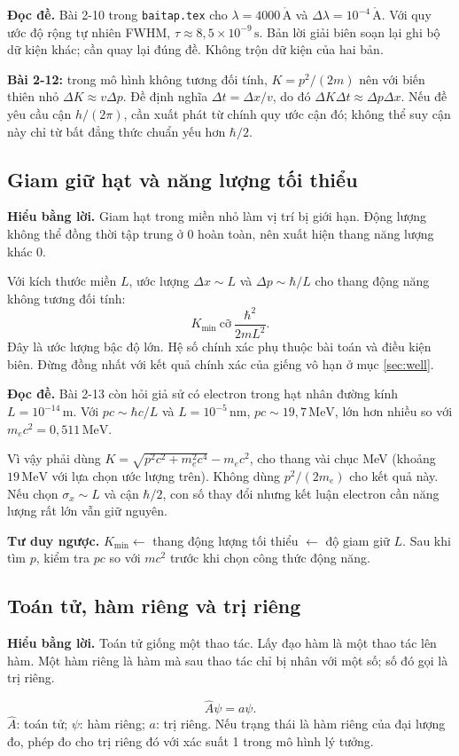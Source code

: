 \documentclass[11pt,a4paper]{article}
\newcommand{\unit}[1]{\,\mathrm{#1}}
\newcommand{\idea}[1]{\par\textbf{Hiểu bằng lời.} #1\par}
\newcommand{\readit}[1]{\par\textbf{Đọc đề.} #1\par}
\newcommand{\think}[1]{\par\textbf{Tư duy ngược.} #1\par}
\begin{document}
\readit{Bài 2-10 trong \texttt{baitap.tex} cho
$\lambda=4000\unit{\mathring A}$ và $\Delta\lambda=10^{-4}\unit{\mathring A}$.
Với quy ước độ rộng tự nhiên FWHM, $\tau\approx8{,}5\times10^{-9}\unit s$.
Bản lời giải biên soạn lại ghi bộ dữ kiện khác; cần quay lại đúng đề.
Không trộn dữ kiện của hai bản.}

\textbf{Bài 2-12:} trong mô hình không tương đối tính,
$K=p^2/(2m)$ nên với biến thiên nhỏ $\Delta K\approx v\Delta p$.
Đề định nghĩa $\Delta t=\Delta x/v$, do đó
$\Delta K\Delta t\approx\Delta p\Delta x$.
Nếu đề yêu cầu cận $h/(2\pi)$, cần xuất phát từ chính quy ước cận đó;
không thể suy cận này chỉ từ bất đẳng thức chuẩn yếu hơn $\hbar/2$.

\subsection{Giam giữ hạt và năng lượng tối thiểu}\label{sec:confinement}
\idea{Giam hạt trong miền nhỏ làm vị trí bị giới hạn. Động lượng không thể
đồng thời tập trung ở 0 hoàn toàn, nên xuất hiện thang năng lượng khác 0.}
Với kích thước miền $L$, ước lượng $\Delta x\sim L$ và
$\Delta p\sim\hbar/L$ cho thang động năng không tương đối tính:
\[
K_{\min}\ \text{cỡ}\ \frac{\hbar^2}{2mL^2}.
\]
Đây là ước lượng bậc độ lớn. Hệ số chính xác phụ thuộc bài toán và điều kiện biên.
Đừng đồng nhất với kết quả chính xác của giếng vô hạn ở mục \ref{sec:well}.

\readit{Bài 2-13 còn hỏi giả sử có electron trong hạt nhân đường kính
$L=10^{-14}\unit m$. Với $pc\sim\hbar c/L$ và $L=10^{-5}\unit{nm}$,
$pc\sim19{,}7\unit{MeV}$, lớn hơn nhiều so với $m_ec^2=0{,}511\unit{MeV}$.}
Vì vậy phải dùng
$K=\sqrt{p^2c^2+m_e^2c^4}-m_ec^2$, cho thang vài chục MeV
(khoảng $19\unit{MeV}$ với lựa chọn ước lượng trên).
Không dùng $p^2/(2m_e)$ cho kết quả này.
Nếu chọn $\sigma_x\sim L$ và cận $\hbar/2$, con số thay đổi nhưng kết luận
electron cần năng lượng rất lớn vẫn giữ nguyên.

\think{$K_{\min}\leftarrow$ thang động lượng tối thiểu
$\leftarrow$ độ giam giữ $L$. Sau khi tìm $p$, kiểm tra $pc$ so với $mc^2$
trước khi chọn công thức động năng.}

\subsection{Toán tử, hàm riêng và trị riêng}\label{sec:operator}
\idea{Toán tử giống một thao tác. Lấy đạo hàm là một thao tác lên hàm.
Một hàm riêng là hàm mà sau thao tác chỉ bị nhân với một số;
số đó gọi là trị riêng.}
\[
\hat A\psi=a\psi.
\]
$\hat A$: toán tử; $\psi$: hàm riêng; $a$: trị riêng.
Nếu trạng thái là hàm riêng của đại lượng đo, phép đo cho trị riêng đó
với xác suất 1 trong mô hình lý tưởng.
\end{document}
